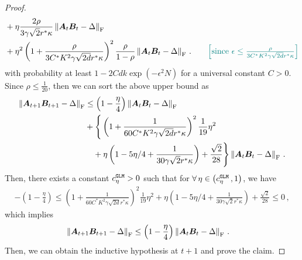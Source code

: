 \begin{proof}
\begin{align*}
        &  + \eta\frac{2\rho}{3\gamma\sqrt{2}r^*\kappa} \left\|\bm A_t \bm B_t - \Delta\right\|_{\rm F}\\
        &  + \eta^2 \left(1+\frac{\rho}{3C^*K^2\gamma\sqrt{2d}r^*\kappa}\right)^2 \frac{\rho}{1-\rho}\left\|\bm A_t\bm B_t-\Delta\right\|_{\rm F}\,. \tag*{\color{teal}$\left[\text{since }\epsilon \leq \frac{\rho}{3C^*K^2\gamma\sqrt{2d}r^*\kappa}\right]$}
    \end{align*}
    with probability at least $1-2Cdk\operatorname{exp}\left(-\epsilon^2 N\right)$ for a universal constant $C>0$. Since $\rho \leq \frac{1}{20}$, then we can sort the above upper bound as
    \begin{align*}
        \left\|\bm A_{t+1}\bm B_{t+1} - \Delta\right\|_{\rm F} & \leq \left(1-\frac{\eta}{4}\right)\left\|\bm A_t \bm B_t - \Delta\right\|_{\rm F}\\
        & + \Bigg\{\left(1+\frac{1}{60 C^*K^2\gamma\sqrt{2d}r^*\kappa}\right)^2 \frac{1}{19} \eta^2 \\
        & \quad +\eta\left(1 - 5\eta/4 + \frac{1}{30\gamma\sqrt{2}r^*\kappa}\right) +\frac{\sqrt{2}}{28}\Bigg\}\left\|\bm A_t \bm B_t - \Delta\right\|_{\rm F}\,.
        \end{align*}
        Then, there exists a constant $c^{\tt GLM}_{\eta}>0$ such that for $\forall\,\eta\in\left(c^{\tt GLM}_{\eta}\,,1\right)$, we have
        \begin{align*}
        -\left(1-\frac{\eta}{4}\right)\leq\left(1+\frac{1}{60 C^*K^2\gamma\sqrt{2d}r^*\kappa}\right)^2 \frac{1}{19} \eta^2
        +\eta\left(1 - 5\eta/4 + \frac{1}{30\gamma\sqrt{2}r^*\kappa}\right) +\frac{\sqrt{2}}{28}\leq 0\,,
        \end{align*}
        which implies
        \begin{align*}
            \left\|\bm A_{t+1}\bm B_{t+1} - \Delta\right\|_{\rm F} & \leq \left(1-\frac{\eta}{4}\right)\left\|\bm A_t \bm B_t - \Delta\right\|_{\rm F}\,.
        \end{align*}
        Then, we can obtain the inductive hypothesis at $t+1$ and prove the claim.
\end{proof}